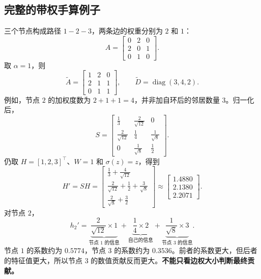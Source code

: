 \documentclass[UTF8,a4paper,11pt,fontset=fandol]{ctexart}
\begin{document}
\subsection{完整的带权手算例子}
三个节点构成路径 $1-2-3$，两条边的权重分别为 $2$ 和 $1$：
\begin{equation}
A=\begin{bmatrix}0&2&0\\2&0&1\\0&1&0\end{bmatrix}.
\end{equation}
取 $\alpha=1$，则
\begin{equation}
\widetilde A=\begin{bmatrix}1&2&0\\2&1&1\\0&1&1\end{bmatrix},
\qquad \widetilde D=\operatorname{diag}(3,4,2).
\end{equation}
例如，节点 $2$ 的加权度数为 $2+1+1=4$，并非加自环后的邻居数量 $3$。归一化后，
\begin{equation}
S=\begin{bmatrix}
\frac13&\frac2{\sqrt{12}}&0\\[2pt]
\frac2{\sqrt{12}}&\frac14&\frac1{\sqrt8}\\[2pt]
0&\frac1{\sqrt8}&\frac12
\end{bmatrix}.
\end{equation}
仍取 $H=[1,2,3]^\top$、$W=1$ 和 $\sigma(z)=z$，得到
\begin{equation}
H'=SH=
\begin{bmatrix}
\frac13+\frac4{\sqrt{12}}\\[3pt]
\frac2{\sqrt{12}}+\frac12+\frac3{\sqrt8}\\[3pt]
\frac2{\sqrt8}+\frac32
\end{bmatrix}
\approx\begin{bmatrix}1.4880\\2.1380\\2.2071\end{bmatrix}.
\end{equation}
对节点 $2$，
\begin{equation}
h_2'=
\underbrace{\frac2{\sqrt{12}}\times1}_{\text{节点 1 的信息}}
+\underbrace{\frac14\times2}_{\text{自己的信息}}
+\underbrace{\frac1{\sqrt8}\times3}_{\text{节点 3 的信息}}.
\end{equation}
节点 $1$ 的系数约为 $0.5774$，节点 $3$ 的系数约为 $0.3536$。前者的系数更大，但后者的特征值更大，所以节点 $3$ 的数值贡献反而更大。\textbf{不能只看边权大小判断最终贡献。}
\end{document}
